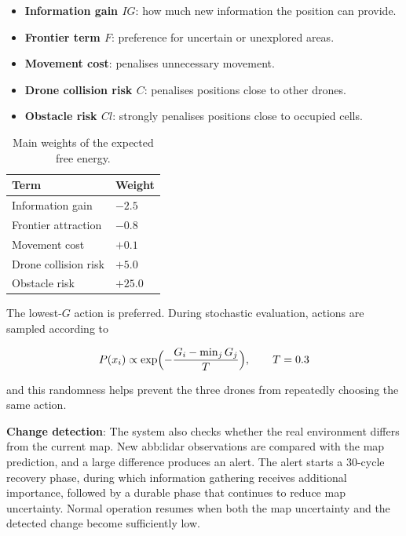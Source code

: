 \begin{itemize}[itemsep=0.3em]
    \item \textbf{Information gain $IG$}: how much new information the position can
          provide.
    \item \textbf{Frontier term $F$}: preference for uncertain or unexplored areas.
    \item \textbf{Movement cost}: penalises unnecessary movement.
    \item \textbf{Drone collision risk $C$}: penalises positions close to other
          drones.
    \item \textbf{Obstacle risk $Cl$}: strongly penalises positions close to
          occupied cells.
\end{itemize}

\begin{table}[H]
    \centering
    \caption{Main weights of the expected free energy.}%
    \label{tab:impl:efe}
    \singlespacing
    \setlength{\tabcolsep}{4pt}
    \begin{tabular}{@{}>{\raggedright\arraybackslash}p{8.0cm}
            >{\raggedleft\arraybackslash}p{3.0cm}@{}}
        \toprule
        \textbf{Term}         & \textbf{Weight} \\
        \midrule
        Information gain      & $-2.5$          \\
        Frontier attraction   & $-0.8$          \\
        Movement cost         & $+0.1$          \\
        Drone collision risk  & $+5.0$          \\
        Obstacle risk         & $+25.0$         \\
        \bottomrule
    \end{tabular}
\end{table}

The lowest-$G$ action is preferred. During stochastic evaluation, actions are
sampled according to

\begin{equation}
    P(x_i) \propto \exp\Bigl(-\frac{G_i - \min_j G_j}{T}\Bigr), \qquad T = 0.3
    \label{eq:impl:softmax}
\end{equation}

and this randomness helps prevent the three drones from repeatedly choosing the
same action.

\textbf{Change detection}: The system also checks whether the real environment
differs from the current map. New \gls{abb:lidar} observations are compared with
the map prediction, and a large difference produces an alert. The alert starts a
30-cycle recovery phase, during which information gathering receives additional
importance, followed by a durable phase that continues to reduce map uncertainty.
Normal operation resumes when both the map uncertainty and the detected change
become sufficiently low.

